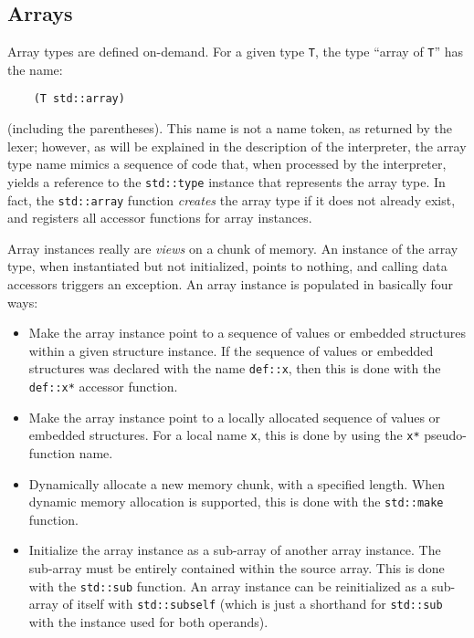 \subsection{Arrays}

Array types are defined on-demand. For a given type \verb|T|, the type
``array of \verb|T|'' has the name:
\begin{verbatim}
    (T std::array)
\end{verbatim}
(including the parentheses). This name is not a name token, as returned
by the lexer; however, as will be explained in the description of the
interpreter, the array type name mimics a sequence of code that, when
processed by the interpreter, yields a reference to the \verb|std::type|
instance that represents the array type. In fact, the \verb|std::array|
function \emph{creates} the array type if it does not already exist, and
registers all accessor functions for array instances.

Array instances really are \emph{views} on a chunk of memory. An
instance of the array type, when instantiated but not initialized,
points to nothing, and calling data accessors triggers an exception.
An array instance is populated in basically four ways:
\begin{itemize}

    \item Make the array instance point to a sequence of values or
    embedded structures within a given structure instance. If the
    sequence of values or embedded structures was declared with the name
    \verb|def::x|, then this is done with the \verb|def::x*| accessor
    function.

    \item Make the array instance point to a locally allocated sequence
    of values or embedded structures. For a local name \verb|x|, this is
    done by using the \verb|x*| pseudo-function name.

    \item Dynamically allocate a new memory chunk, with a specified
    length. When dynamic memory allocation is supported, this is done
    with the \verb|std::make| function.

    \item Initialize the array instance as a sub-array of another array
    instance. The sub-array must be entirely contained within the source
    array. This is done with the \verb|std::sub| function. An array
    instance can be reinitialized as a sub-array of itself with
    \verb|std::subself| (which is just a shorthand for \verb|std::sub|
    with the instance used for both operands).

\end{itemize}


